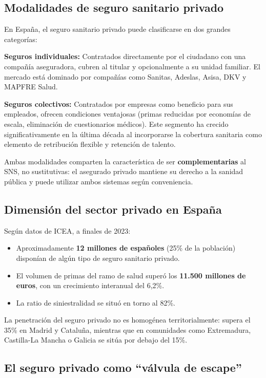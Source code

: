 \subsection{Modalidades de seguro sanitario privado}

En España, el seguro sanitario privado puede clasificarse en dos grandes categorías:

\textbf{Seguros individuales:} Contratados directamente por el ciudadano con una
compañía aseguradora, cubren al titular y opcionalmente a su unidad familiar. El
mercado está dominado por compañías como Sanitas, Adeslas, Asisa, DKV y MAPFRE
Salud.

\textbf{Seguros colectivos:} Contratados por empresas como beneficio para sus
empleados, ofrecen condiciones ventajosas (primas reducidas por economías de
escala, eliminación de cuestionarios médicos). Este segmento ha crecido
significativamente en la última década al incorporarse la cobertura sanitaria como
elemento de retribución flexible y retención de talento.

Ambas modalidades comparten la característica de ser \textbf{complementarias} al
SNS, no sustitutivas: el asegurado privado mantiene su derecho a la sanidad
pública y puede utilizar ambos sistemas según conveniencia.

\subsection{Dimensión del sector privado en España}

Según datos de ICEA, a finales de 2023:

\begin{itemize}
  \item Aproximadamente \textbf{12 millones de españoles} (25\% de la población)
    disponían de algún tipo de seguro sanitario privado.
  \item El volumen de primas del ramo de salud superó los \textbf{11.500 millones
    de euros}, con un crecimiento interanual del 6{,}2\%.
  \item La ratio de siniestralidad se situó en torno al 82\%.
\end{itemize}

La penetración del seguro privado no es homogénea territorialmente: supera el
35\% en Madrid y Cataluña, mientras que en comunidades como Extremadura,
Castilla-La Mancha o Galicia se sitúa por debajo del 15\%.

\subsection{El seguro privado como ``válvula de escape''}

